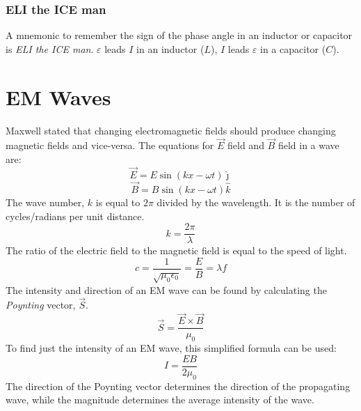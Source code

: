 \documentclass{article}
\begin{document}
\subsubsection{ELI the ICE man}
A mnemonic to remember the sign of the phase angle in an inductor or capacitor is \textit{ELI the ICE man}.  $\varepsilon$ leads $I$ in an inductor ($L$),  $I$ leads $\varepsilon$ in a capacitor ($C$).
\section{EM Waves}
Maxwell stated that changing electromagnetic fields should produce changing magnetic fields and vice-versa.  The equations for $\vec{E}$ field and $\vec{B}$ field in a wave are:
\[\vec{E} = E\sin(kx - \omega t)\hat{\jmath}\]
\[\vec{B} = B\sin(kx - \omega t)\hat{k}\]
The wave number, $k$ is equal to $2\pi$ divided by the wavelength.  It is the number of cycles/radians per unit distance.
\[k=\frac{2\pi}{\lambda}\]
The ratio of the electric field to the magnetic field is equal to the speed of light.
\[c = \frac{1}{\sqrt{\mu_0\epsilon_0}}=\frac{E}{B}=\lambda f\]
The intensity and direction of an EM wave can be found by calculating the \textit{Poynting} vector, $\vec{S}$.
\[\vec{S}=\frac{\vec{E} \times \vec{B}}{\mu_0}\]
To find just the intensity of an EM wave, this simplified formula can be used:
\[ I = \frac{EB}{2\mu_0} \]
The direction of the Poynting vector determines the direction of the propagating wave, while the magnitude determines the average intensity of the wave.
\end{document}
